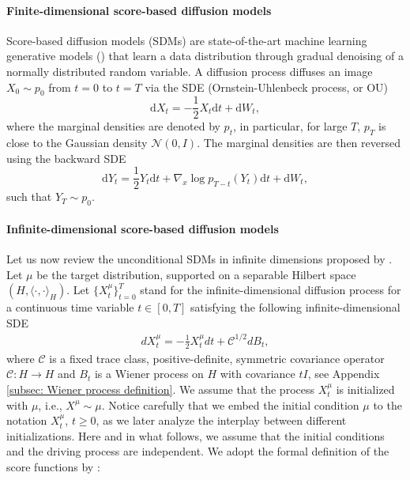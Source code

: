 \documentclass[10pt]{article} %
\theoremstyle{plain}
\theoremstyle{definition}
\theoremstyle{remark}
\newcommand{\C}{\mathcal C}
\newcommand{\dd}{{\mathrm d}}
\begin{document}
\paragraph{Finite-dimensional score-based diffusion models}
Score-based diffusion models (SDMs) are state-of-the-art machine learning generative models (\cite{song2021scorebasedDiffusion}) that learn a data distribution through gradual denoising of a normally distributed random variable. A diffusion process diffuses an image $X_0\sim p_0$ from $t=0$ to $t=T$ via the SDE (Ornstein-Uhlenbeck process, or OU)
\begin{equation*}
    \dd X_t = -\frac{1}{2}X_t \dd t + \dd W_t,
\end{equation*}
where the marginal densities are denoted by $p_t$, in particular, for large $T$, $p_T$ is close to the  Gaussian density $\mathcal{N}(0,I)$. The marginal densities are then reversed using the backward SDE
\begin{equation*}
    \dd Y_t = \frac{1}{2}Y_t \dd t + \nabla_x\log p_{T-t}(Y_t)\dd t + \dd W_t,
\end{equation*}
such that $Y_T \sim p_0$.

\paragraph{Infinite-dimensional score-based diffusion models}
Let us now review the unconditional SDMs in infinite dimensions proposed by \citet{pidstrigach2023infinitedimensional}. Let $\mu$ be the target distribution, supported on a separable Hilbert space $(H, \langle \cdot, \cdot \rangle_H)$.
Let $\{X^\mu_t\}_{t=0}^T$ stand for the infinite-dimensional diffusion process for a continuous time variable $t\in [0,T]$ satisfying the following infinite-dimensional SDE
\begin{eqnarray}\label{eq: diffusion model; initiated from posterior} 
    dX^{\mu}_t = -\frac{1}{2} X^{\mu}_t dt +  \C^{1/2} dB_t,
    \end{eqnarray}
where $\C$ is a fixed trace class, positive-definite, symmetric covariance operator $\C: H\to H$ and $B_t$ is a Wiener process on $H$ with covariance $tI$,
see Appendix \ref{subsec: Wiener process definition}. 
We assume that the process  $X^{\mu}_t$ is initialized with $\mu$, i.e., $X^\mu \sim \mu$. Notice carefully that we embed the initial condition $\mu$ to the notation $X^\mu_t$, $t\geq 0$, as we later analyze the interplay between different initializations. Here and in what follows, we assume that the initial conditions and the driving process are independent. 
We adopt the formal definition of the score functions by \citet{pidstrigach2023infinitedimensional}:
\end{document}
